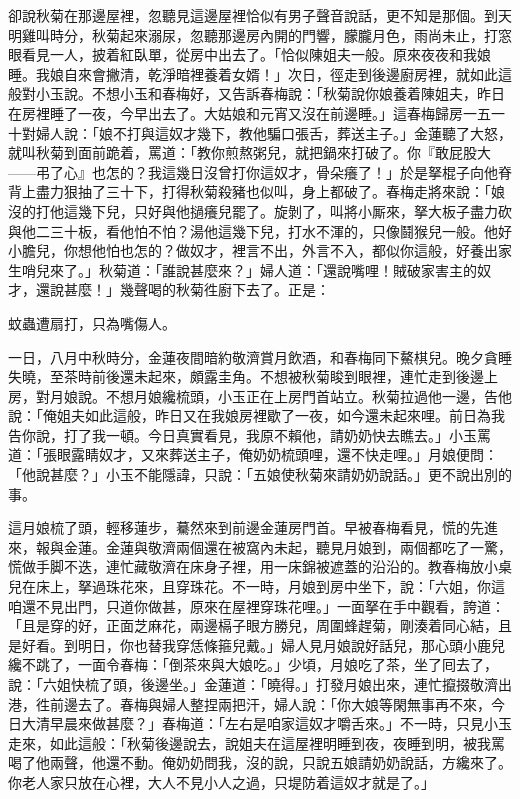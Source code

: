 卻說秋菊在那邊屋裡，忽聽見這邊屋裡恰似有男子聲音說話，更不知是那個。到天明雞叫時分，秋菊起來溺尿，忽聽那邊房內開的門響，朦朧月色，雨尚未止，打窓眼看見一人，披着紅臥單，從房中出去了。「恰似陳姐夫一般。{}原來夜夜和我娘睡。我娘自來會撇清，乾淨暗裡養着女婿！」次日，徑走到後邊廚房裡，就如此這般對小玉說。不想小玉和春梅好，又告訴春梅說：「秋菊說你娘養着陳姐夫，昨日在房裡睡了一夜，今早出去了。大姑娘和元宵又沒在前邊睡。」這春梅歸房一五一十對婦人說：「娘不打與這奴才幾下，教他騙口張舌，葬送主子。」金蓮聽了大怒，就叫秋菊到面前跪着，罵道：「教你煎熬粥兒，就把鍋來打破了。你『敢屁股大——弔了心』也怎的？我這幾日沒曾打你這奴才，骨朵癢了！」於是拏棍子向他脊背上盡力狠抽了三十下，打得秋菊殺豬也似叫，身上都破了。{}春梅走將來說：「娘沒的打他這幾下兒，只好與他撾癢兒罷了。旋剝了，叫將小厮來，拏大板子盡力砍與他二三十板，看他怕不怕？湯他這幾下兒，打水不渾的，只像鬪猴兒一般。他好小膽兒，你想他怕也怎的？做奴才，裡言不出，外言不入，都似你這般，好養出家生哨兒來了。」{}秋菊道：「誰說甚麼來？」婦人道：「還說嘴哩！賊破家害主的奴才，還說甚麼！」幾聲喝的秋菊徃廚下去了。正是：

蚊蟲遭扇打，只為嘴傷人。

一日，八月中秋時分，金蓮夜間暗約敬濟賞月飲酒，和春梅同下鰲棋兒。晚夕貪睡失曉，至茶時前後還未起來，頗露圭角。不想被秋菊睃到眼裡，連忙走到後邊上房，對月娘說。不想月娘纔梳頭，小玉正在上房門首站立。秋菊拉過他一邊，告他說：「俺姐夫如此這般，昨日又在我娘房裡歇了一夜，如今還未起來哩。前日為我告你說，打了我一頓。今日真實看見，我原不賴他，請奶奶快去瞧去。」小玉罵道：「張眼露睛奴才，又來葬送主子，俺奶奶梳頭哩，還不快走哩。」月娘便問：「他說甚麼？」小玉不能隱諱，只說：「五娘使秋菊來請奶奶說話。」更不說出別的事。

這月娘梳了頭，輕移蓮步，驀然來到前邊金蓮房門首。早被春梅看見，慌的先進來，報與金蓮。金蓮與敬濟兩個還在被窩內未起，聽見月娘到，兩個都吃了一驚，慌做手脚不迭，連忙藏敬濟在床身子裡，用一床錦被遮蓋的沿沿的。{}教春梅放小桌兒在床上，拏過珠花來，且穿珠花。不一時，月娘到房中坐下，說：「六姐，你這咱還不見出門，只道你做甚，原來在屋裡穿珠花哩。」一面拏在手中觀看，誇道：「且是穿的好，正面芝麻花，兩邊槅子眼方勝兒，周圍蜂趕菊，剛湊着同心結，且是好看。到明日，你也替我穿恁條箍兒戴。」婦人見月娘說好話兒，那心頭小鹿兒纔不跳了，一面令春梅：「倒茶來與大娘吃。」少頃，月娘吃了茶，坐了囘去了，說：「六姐快梳了頭，後邊坐。」金蓮道：「曉得。」打發月娘出來，連忙攛掇敬濟出港，徃前邊去了。春梅與婦人整捏兩把汗，婦人說：「你大娘等閑無事再不來，今日大清早晨來做甚麼？」春梅道：「左右是咱家這奴才嚼舌來。」不一時，只見小玉走來，如此這般：「秋菊後邊說去，說姐夫在這屋裡明睡到夜，夜睡到明，被我罵喝了他兩聲，他還不動。{}俺奶奶問我，沒的說，只說五娘請奶奶說話，方纔來了。你老人家只放在心裡，大人不見小人之過，只堤防着這奴才就是了。」

